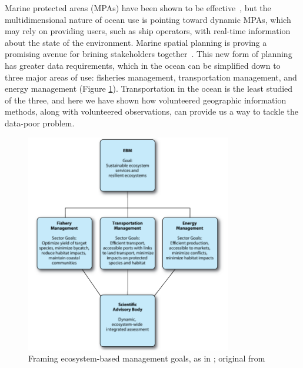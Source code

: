 \documentclass[12pt,letterpaper]{article}
\begin{document}
Marine protected areas (MPAs) have been shown to be effective~\citep{halpern2002marine}, but the multidimensional nature of ocean use is pointing toward dynamic MPAs, which may rely on providing users, such as ship operators, with real-time information about the state of the environment. Marine spatial planning is proving a promising avenue for brining stakeholders together~\citep{merrifield2012marinemap}. This new form of planning has greater data requirements, which in the ocean can be simplified down to three major areas of use: fisheries management, transportation management, and energy management (Figure \ref{fig:framing}). Transportation in the ocean is the least studied of the three, and here we have shown how volunteered geographic information methods, along with volunteered observations, can provide us a way to tackle the data-poor problem.

\begin{figure}[h!]
  \centering
    \includegraphics[width=90mm]{images/lubechenco-diagram.png}
  \caption {Framing ecosystem-based management goals, as in \cite{Lubchenco2010}; original from \citep{McLeod2009}}
  \label{fig:framing}
\end{figure}





\end{document}
